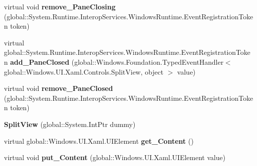\begin{DoxyCompactItemize}
\item 
\mbox{\label{class_windows_1_1_u_i_1_1_xaml_1_1_controls_1_1_split_view_a7e6d1bbf867167e713891bded6a87a82}} 
virtual void {\bfseries remove\+\_\+\+Pane\+Closing} (global\+::\+System.\+Runtime.\+Interop\+Services.\+Windows\+Runtime.\+Event\+Registration\+Token token)
\item 
\mbox{\label{class_windows_1_1_u_i_1_1_xaml_1_1_controls_1_1_split_view_a97df60d3e67c146b713f4eb1565c5602}} 
virtual global\+::\+System.\+Runtime.\+Interop\+Services.\+Windows\+Runtime.\+Event\+Registration\+Token {\bfseries add\+\_\+\+Pane\+Closed} (global\+::\+Windows.\+Foundation.\+Typed\+Event\+Handler$<$ global\+::\+Windows.\+U\+I.\+Xaml.\+Controls.\+Split\+View, object $>$ value)
\item 
\mbox{\label{class_windows_1_1_u_i_1_1_xaml_1_1_controls_1_1_split_view_a512973422bb0ef5a03c4a96d88f7f082}} 
virtual void {\bfseries remove\+\_\+\+Pane\+Closed} (global\+::\+System.\+Runtime.\+Interop\+Services.\+Windows\+Runtime.\+Event\+Registration\+Token token)
\item 
\mbox{\label{class_windows_1_1_u_i_1_1_xaml_1_1_controls_1_1_split_view_a83623aee98314bfa486d2e3c5b583543}} 
{\bfseries Split\+View} (global\+::\+System.\+Int\+Ptr dummy)
\item 
\mbox{\label{class_windows_1_1_u_i_1_1_xaml_1_1_controls_1_1_split_view_a8e8c81d98be4733b9d0e0c12f077d2ab}} 
virtual global\+::\+Windows.\+U\+I.\+Xaml.\+U\+I\+Element {\bfseries get\+\_\+\+Content} ()
\item 
\mbox{\label{class_windows_1_1_u_i_1_1_xaml_1_1_controls_1_1_split_view_a858c49c1b29c83b8d2256306a2311f25}} 
virtual void {\bfseries put\+\_\+\+Content} (global\+::\+Windows.\+U\+I.\+Xaml.\+U\+I\+Element value)
\item 
\mbox{\label{class_windows_1_1_u_i_1_1_xaml_1_1_controls_1_1_split_view_a6c58d7776daf88d1bd3c41ac7d058eaa}} 

\end{DoxyCompactItemize}
